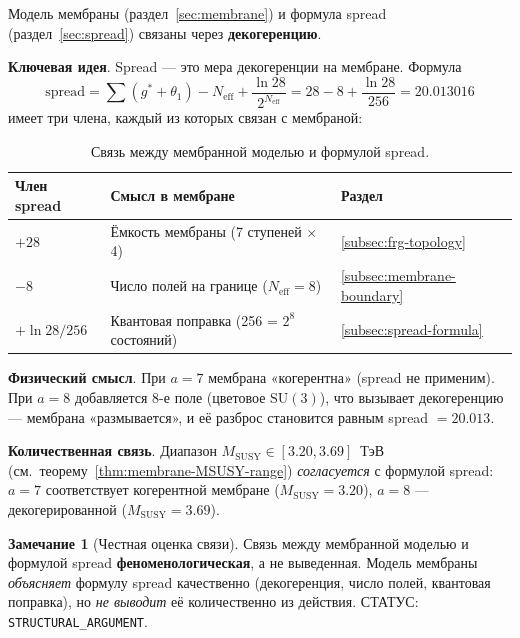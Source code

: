 \documentclass[11pt,a4paper]{article}
\newcommand{\SU}{\ensuremath{\mathrm{SU}}}
\theoremstyle{definition}
\newtheorem{remark}[theorem]{Замечание}
\begin{document}
Модель мембраны (раздел~\ref{sec:membrane}) и формула spread
(раздел~\ref{sec:spread}) связаны через \textbf{декогеренцию}.

\medskip\noindent
\textbf{Ключевая идея}. Spread --- это мера декогеренции
на мембране. Формула
\begin{equation}
    \text{spread} = \sum(g^*+\theta_1) - N_{\text{eff}}
    + \frac{\ln 28}{2^{N_{\text{eff}}}}
    = 28 - 8 + \frac{\ln 28}{256}
    = 20.013016
\end{equation}
имеет три члена, каждый из которых связан с мембраной:

\begin{table}[ht]
\centering
\caption{Связь между мембранной моделью и формулой spread.}
\label{tab:membrane-spread-link}
\begin{tabular}{lll}
\toprule
Член spread & Смысл в мембране & Раздел \\
\midrule
$+28$ & Ёмкость мембраны (7 ступеней $\times$ 4) &
    \ref{subsec:frg-topology} \\
$-8$  & Число полей на границе ($N_{\text{eff}} = 8$) &
    \ref{subsec:membrane-boundary} \\
$+\ln 28 / 256$ & Квантовая поправка (256 = $2^8$ состояний) &
    \ref{subsec:spread-formula} \\
\bottomrule
\end{tabular}
\end{table}

\medskip\noindent
\textbf{Физический смысл}. При $a = 7$ мембрана «когерентна»
(spread не применим). При $a = 8$ добавляется 8-е поле
(цветовое $\SU(3)$), что вызывает декогеренцию ---
мембрана «размывается», и её разброс становится равным
spread $= 20.013$.

\medskip\noindent
\textbf{Количественная связь}. Диапазон
$M_{\text{SUSY}} \in [3.20, 3.69]$~ТэВ (см.~теорему~\ref{thm:membrane-MSUSY-range})
\emph{согласуется} с формулой spread: $a = 7$
соответствует когерентной мембране ($M_{\text{SUSY}} = 3.20$),
$a = 8$ --- декогерированной ($M_{\text{SUSY}} = 3.69$).

\begin{remark}[Честная оценка связи]
\label{rem:membrane-spread-honest}
Связь между мембранной моделью и формулой spread
\textbf{феноменологическая}, а не выведенная.
Модель мембраны \emph{объясняет} формулу spread
качественно (декогеренция, число полей, квантовая поправка),
но \emph{не выводит} её количественно из действия.
СТАТУС: \texttt{STRUCTURAL\_ARGUMENT}.
\end{remark}                                  
\end{document}
